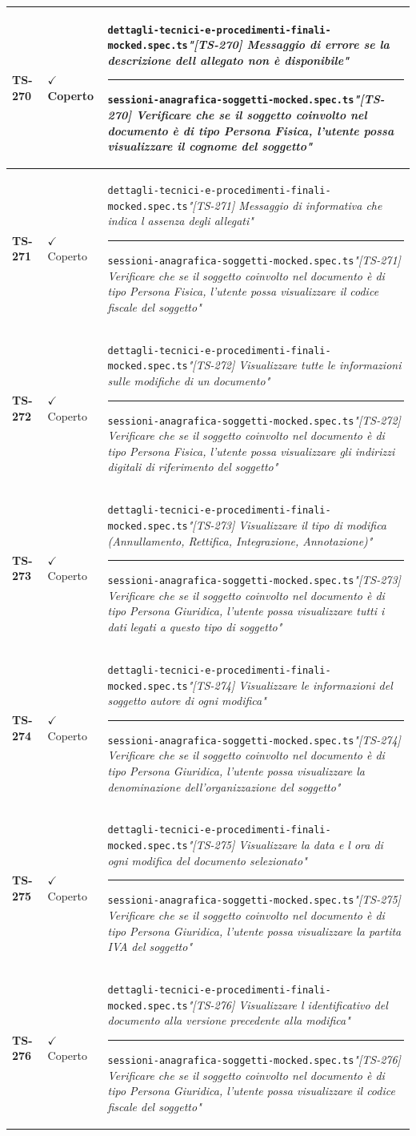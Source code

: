 \documentclass[a4paper,12pt]{article}
\newcommand{\ok}{\textcolor{green!60!black}{$\checkmark$ Coperto}}
\newcommand{\f}[1]{\nolinkurl{#1}\newline}
\newcommand{\q}[1]{\textit{#1}}
\newcommand{\sep}{\newline \vspace{2mm} \hrule \vspace{2mm}}
\begin{document}
\begin{longtable}{|p{1.5cm}|p{3.0cm}|p{10.5cm}|}
\textbf{TS-270} & \ok & \f{dettagli-tecnici-e-procedimenti-finali-mocked.spec.ts}\q{"[TS-270] Messaggio di errore se la descrizione dell allegato non è disponibile"} \sep \f{sessioni-anagrafica-soggetti-mocked.spec.ts}\q{"[TS-270] Verificare che se il soggetto coinvolto nel documento è di tipo Persona Fisica, l'utente possa visualizzare il cognome del soggetto"} \\ \hline
\textbf{TS-271} & \ok & \f{dettagli-tecnici-e-procedimenti-finali-mocked.spec.ts}\q{"[TS-271] Messaggio di informativa che indica l assenza degli allegati"} \sep \f{sessioni-anagrafica-soggetti-mocked.spec.ts}\q{"[TS-271] Verificare che se il soggetto coinvolto nel documento è di tipo Persona Fisica, l'utente possa visualizzare il codice fiscale del soggetto"} \\ \hline
\textbf{TS-272} & \ok & \f{dettagli-tecnici-e-procedimenti-finali-mocked.spec.ts}\q{"[TS-272] Visualizzare tutte le informazioni sulle modifiche di un documento"} \sep \f{sessioni-anagrafica-soggetti-mocked.spec.ts}\q{"[TS-272] Verificare che se il soggetto coinvolto nel documento è di tipo Persona Fisica, l'utente possa visualizzare gli indirizzi digitali di riferimento del soggetto"} \\ \hline
\textbf{TS-273} & \ok & \f{dettagli-tecnici-e-procedimenti-finali-mocked.spec.ts}\q{"[TS-273] Visualizzare il tipo di modifica (Annullamento, Rettifica, Integrazione, Annotazione)"} \sep \f{sessioni-anagrafica-soggetti-mocked.spec.ts}\q{"[TS-273] Verificare che se il soggetto coinvolto nel documento è di tipo Persona Giuridica, l'utente possa visualizzare tutti i dati legati a questo tipo di soggetto"} \\ \hline
\textbf{TS-274} & \ok & \f{dettagli-tecnici-e-procedimenti-finali-mocked.spec.ts}\q{"[TS-274] Visualizzare le informazioni del soggetto autore di ogni modifica"} \sep \f{sessioni-anagrafica-soggetti-mocked.spec.ts}\q{"[TS-274] Verificare che se il soggetto coinvolto nel documento è di tipo Persona Giuridica, l'utente possa visualizzare la denominazione dell'organizzazione del soggetto"} \\ \hline
\textbf{TS-275} & \ok & \f{dettagli-tecnici-e-procedimenti-finali-mocked.spec.ts}\q{"[TS-275] Visualizzare la data e l ora di ogni modifica del documento selezionato"} \sep \f{sessioni-anagrafica-soggetti-mocked.spec.ts}\q{"[TS-275] Verificare che se il soggetto coinvolto nel documento è di tipo Persona Giuridica, l'utente possa visualizzare la partita IVA del soggetto"} \\ \hline
\textbf{TS-276} & \ok & \f{dettagli-tecnici-e-procedimenti-finali-mocked.spec.ts}\q{"[TS-276] Visualizzare l identificativo del documento alla versione precedente alla modifica"} \sep \f{sessioni-anagrafica-soggetti-mocked.spec.ts}\q{"[TS-276] Verificare che se il soggetto coinvolto nel documento è di tipo Persona Giuridica, l'utente possa visualizzare il codice fiscale del soggetto"} \\ \hline

\end{longtable}
\end{document}

